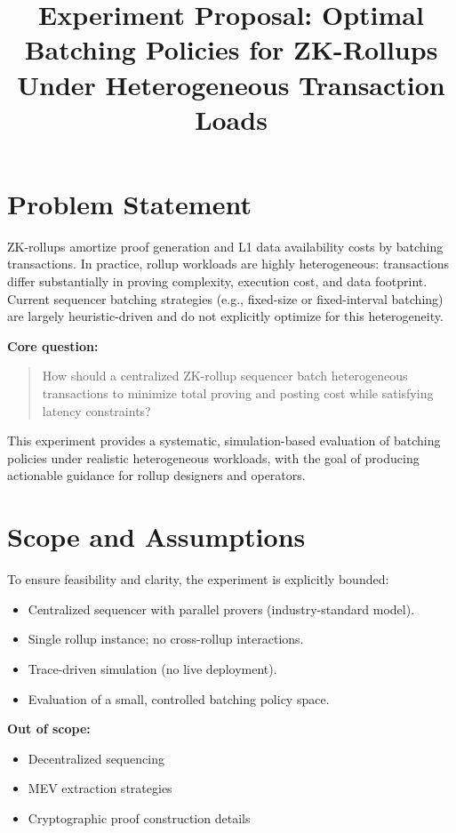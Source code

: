 \documentclass[11pt]{article}
\title{\textbf{Experiment Proposal: Optimal Batching Policies for ZK-Rollups Under Heterogeneous Transaction Loads}}
\author{}
\date{}
\begin{document}
\maketitle

\section{Problem Statement}

ZK-rollups amortize proof generation and L1 data availability costs by batching transactions. In practice, rollup workloads are highly heterogeneous: transactions differ substantially in proving complexity, execution cost, and data footprint. Current sequencer batching strategies (e.g., fixed-size or fixed-interval batching) are largely heuristic-driven and do not explicitly optimize for this heterogeneity.

\textbf{Core question:}
\begin{quote}
How should a centralized ZK-rollup sequencer batch heterogeneous transactions to minimize total proving and posting cost while satisfying latency constraints?
\end{quote}

This experiment provides a systematic, simulation-based evaluation of batching policies under realistic heterogeneous workloads, with the goal of producing actionable guidance for rollup designers and operators.

\section{Scope and Assumptions}

To ensure feasibility and clarity, the experiment is explicitly bounded:

\begin{itemize}[leftmargin=1.5em]
    \item Centralized sequencer with parallel provers (industry-standard model).
    \item Single rollup instance; no cross-rollup interactions.
    \item Trace-driven simulation (no live deployment).
    \item Evaluation of a small, controlled batching policy space.
\end{itemize}

\textbf{Out of scope:}
\begin{itemize}[leftmargin=1.5em]
    \item Decentralized sequencing
    \item MEV extraction strategies
    \item Cryptographic proof construction details
\end{itemize}
\end{document}
